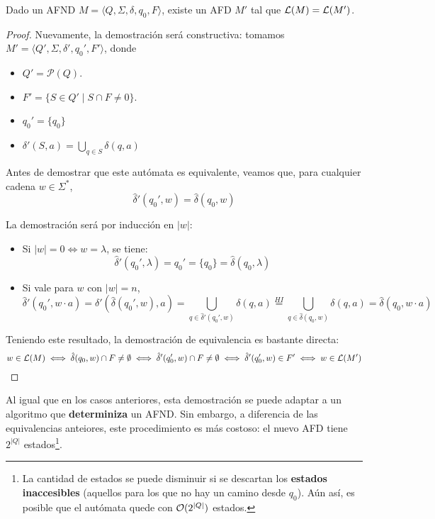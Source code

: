 \begin{theorem*}
    Dado un AFND $M = \langle Q, \Sigma, \delta, q_0, F \rangle$, existe un AFD $M'$ tal que $\mathcal{L}(M) = \mathcal{L}(M')$.
\end{theorem*}
\begin{proof}
    Nuevamente, la demostración será constructiva: tomamos $M' = \langle Q', \Sigma, \delta', q_0', F' \rangle$, donde
    \begin{itemize}
        \item $Q' = \mathcal P (Q)$.
        \item $F' = \{S \in Q' \mid S \cap F \neq 0\}$.
        \item $q_0' = \{q_0\}$
        \item $\delta'(S, a) = \bigcup_{q \in S} \delta(q, a)$
    \end{itemize}

    Antes de demostrar que este autómata es equivalente, veamos que, para cualquier cadena $w \in \Sigma^*$,
    $$\hat \delta'(q_0', w) = \hat \delta(q_0, w)$$
    
    La demostración será por inducción en $|w|$:
    \begin{itemize}
        \item Si $|w| = 0 \iff w = \lambda$, se tiene:
        $$\hat \delta'(q_0', \lambda) = q_0' = \{q_0\} = \hat \delta(q_0, \lambda)$$
        \item Si vale para $w$ con $|w| = n$,
        $$\hat \delta'(q_0', w \cdot a) = \delta'(\hat \delta(q_0', w), a) = \bigcup_{q \in \hat \delta'(q_0', w)} \delta(q, a) \overset{HI}{=} \bigcup_{q \in \hat \delta(q_0, w)} \delta(q, a) = \hat \delta(q_0, w \cdot a)$$
    \end{itemize}

    Teniendo este resultado, la demostración de equivalencia es bastante directa:
    $$w \in \mathcal{L}(M) \iff \hat \delta(q_0, w) \cap F \neq \emptyset \iff \hat \delta'(q_0', w) \cap F \neq \emptyset \iff \hat \delta'(q_0', w) \in F' \iff w \in \mathcal{L}(M')$$
\end{proof}

Al igual que en los casos anteriores, esta demostración se puede adaptar a un algoritmo que \textbf{determiniza} un AFND. Sin embargo, a diferencia de las equivalencias anteiores, este procedimiento es más costoso: el nuevo AFD tiene $2^{|Q|}$ estados\footnote{La cantidad de estados se puede disminuir si se descartan los \textbf{estados inaccesibles} (aquellos para los que no hay un camino desde $q_0$). Aún así, es posible que el autómata quede con $\mathcal{O}(2^{|Q|})$ estados.}.
